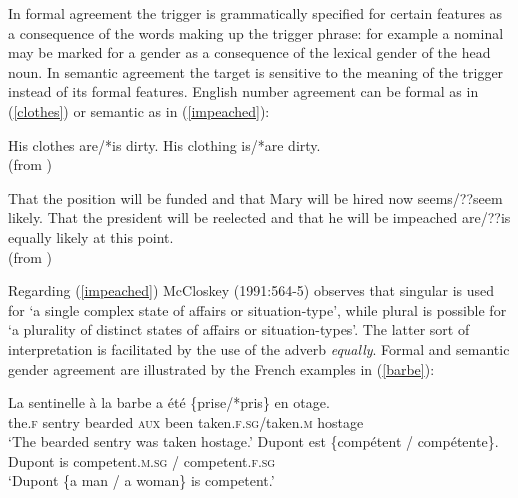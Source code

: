 \documentclass[output=paper]{langsci/langscibook}
\begin{document}
\noindent
 In formal agreement the trigger is grammatically specified for certain features as a consequence of the words making up the trigger phrase: for example a nominal may be marked for a gender as a consequence of the lexical gender of the head noun.  In semantic agreement the target is sensitive to the meaning of the trigger instead of its formal features.  English number agreement can be formal as in (\ref{clothes}) or semantic as in (\ref{impeached}):

\begin{exe} 
\ex \label{clothes}
 \begin{xlist}
\ex   His clothes are/*is dirty.
\ex   His clothing is/*are dirty.  \\ (from \cite[p. \ 92]{Wechsler:2013})
\end{xlist}
\end{exe}

\begin{exe} 
\ex \label{impeached}
 \begin{xlist}
\ex   That the position will be funded and that Mary will be hired now seems/??seem likely.
\ex  	That the president will be reelected and that he will be impeached are/??is equally likely at this point. \\ (from \cite[p. \ 92]{Mccloskey:1991})
\end{xlist}
\end{exe}

\noindent
Regarding (\ref{impeached}) McCloskey (1991:564-5) observes that singular is used for ‘a single complex state of affairs or situation-type’, while plural is possible for ‘a plurality of distinct states of affairs or situation-types’.  The latter sort of interpretation is facilitated by the use of the adverb \textit{equally}.   Formal and semantic gender agreement are illustrated by the French examples in (\ref{barbe}):

\begin{exe} 
\ex \label{barbe}
 \begin{xlist}
\ex   
\gll   La sentinelle	{\`{a} la barbe}	a \'{e}t\'{e}	\{prise/*pris\}	{en otage}.  \\
		the.\textsc{f} sentry	bearded	\textsc{aux} been	taken.\textsc{f.sg}/taken.\textsc{m}	hostage \\
\glt		‘The bearded sentry was taken hostage.’
\ex   
\gll   Dupont	est	\{comp\'{e}tent /		comp\'{e}tente\}. \\
		Dupont	is	competent.\textsc{m.sg} /	competent.\textsc{f.sg} \\
\glt		‘Dupont \{a man / a woman\} is competent.’
 \end{xlist}
\end{exe} 
\end{document}
